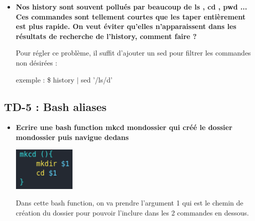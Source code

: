 \documentclass[12pt]{article}
\begin{document}
\begin{itemize}
  \item \textbf{Nos history sont souvent pollués par beaucoup de ls , cd , pwd ...
  Ces commandes sont tellement courtes que les taper entièrement est plus rapide.
  On veut éviter qu'elles n'apparaissent dans les résultats de recherche de
  l'history, comment faire ?}
  \vspace{0.3cm}

  Pour régler ce problème, il suffit d'ajouter un sed pour filtrer les commandes non désirées : \newline

  exemple : \$ history $|$ sed '/ls/d'

\end{itemize}

  \subsection{TD-5 : Bash aliases}
\vspace{0.3cm}

\begin{itemize}
  \item \textbf{Ecrire une bash function mkcd mondossier qui créé le dossier mondossier
  puis navigue dedans}
  \vspace{0.3cm}

  \includegraphics[width=3cm]{screen-mkcd-td5.png}
  \vspace{0.3cm}

  Dans cette bash function, on va prendre l'argument 1 qui est le chemin de création du dossier pour pouvoir
  l'inclure dans les 2 commandes en dessous.

\end{itemize}
\end{document}
